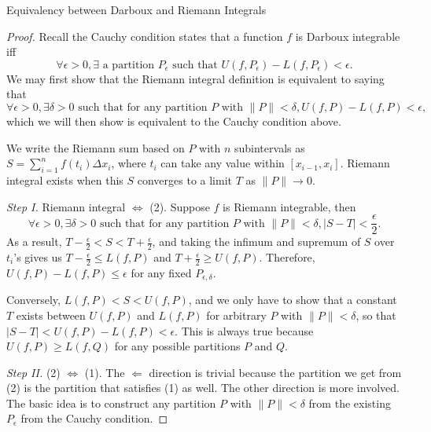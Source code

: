 \documentclass{article}
\newcommand{\nm}[1]{\lVert #1 \rVert}
\newcommand{\abs}[1]{\lvert #1 \rvert}
\begin{document}
\begin{center}
    \Large Equivalency between Darboux and Riemann Integrals
\end{center}

\begin{proof}
    Recall the Cauchy condition states that a function $f$ is Darboux integrable iff 
    \begin{equation}
        \forall \epsilon>0, \exists \text{ a partition } P_\epsilon \text{ such that } U(f, P_\epsilon) - L(f, P_\epsilon) < \epsilon.
    \end{equation}
    We may first show that the Riemann integral definition is equivalent to saying that
    \begin{equation}
        \forall \epsilon > 0, \exists \delta > 0 \text{ such that for any partition } P \text{ with } \nm{P} < \delta, U(f, P) - L(f, P) < \epsilon,
    \end{equation}
    which we will then show is equivalent to the Cauchy condition above. 
    
    We write the Riemann sum based on $P$ with $n$ subintervals as $S = \sum_{i = 1}^{n} f(t_i) \Delta x_i$, where $t_i$ can take any value within $[ x_{i-1}, x_{i}]$. Riemann integral exists when this $S$ converges to a limit $T$ as $\nm{P} \to 0$.
    
    \emph{Step I.} Riemann integral $\Longleftrightarrow$ (2).
    Suppose $f$ is Riemann integrable, then $$\forall \epsilon > 0, \exists \delta > 0 \text{ such that for any partition } P \text{ with } \nm{P} < \delta, \abs{S - T} < \frac{\epsilon}{2}.$$
    As a result, $T - \frac{\epsilon}{2} < S < T + \frac{\epsilon}{2}$, and taking the infimum and supremum of $S$ over $t_i$'s gives us $T - \frac{\epsilon}{2} \leq L(f,P)$ and $T + \frac{\epsilon}{2} \geq U(f,P)$. Therefore, $U(f,P) - L(f,P) \leq \epsilon$ for any fixed $P_{\epsilon,\delta}$.
    
    Conversely, $L(f,P) < S < U(f,P)$, and we only have to show that a constant $T$ exists between $U(f,P)$ and $L(f,P)$ for arbitrary $P$ with $\nm{P} < \delta$, so that $\abs{S - T} < U(f,P) - L(f,P) < \epsilon$. This is always true because $U(f,P) \geq L(f,Q)$ for any possible partitions $P$ and $Q$.
    
    \emph{Step II.} (2) $\Longleftrightarrow$ (1). The $\Longleftarrow$ direction is trivial because the partition we get from (2) is the partition that satisfies (1) as well.
    The other direction is more involved. The basic idea is to construct any partition $P$ with $\nm{P} < \delta$ from the existing $P_\epsilon$ from the Cauchy condition.
    

\end{proof}
\end{document}

